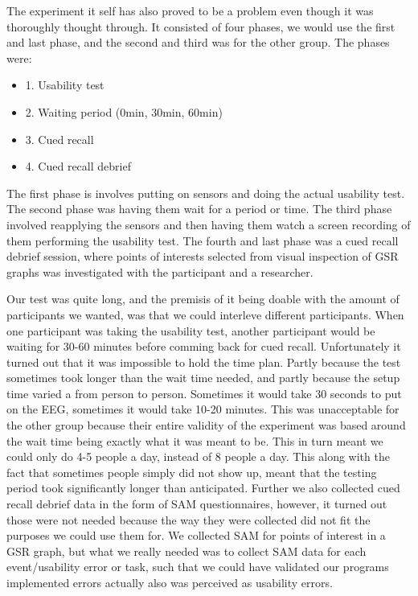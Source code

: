 The experiment it self has also proved to be a problem even though it was thoroughly thought through. 
It consisted of four phases, we would use the first and last phase, and the second and third was for the other group. The phases were:

\begin{itemize}
\item 1. Usability test
\item 2. Waiting period (0min, 30min, 60min)
\item 3. Cued recall
\item 4. Cued recall debrief
\end{itemize}

The first phase is involves putting on sensors and doing the actual usability test. The second phase was having them wait for a period or time. 
The third phase involved reapplying the sensors and then having them watch a screen recording of them performing the usability test.
The fourth and last phase was a cued recall debrief session, where points of interests selected from visual inspection of GSR graphs was investigated with the participant and a researcher.

Our test was quite long, and the premisis of it being doable with the amount of participants we wanted, was that we could interleve different participants. 
When one participant was taking the usability test, another participant would be waiting for 30-60 minutes before comming back for cued recall. 
Unfortunately it turned out that it was impossible to hold the time plan. Partly because the test sometimes took longer than the wait time needed, and partly because the setup time varied a from person to person. Sometimes it would take 30 seconds to put on the EEG, sometimes it would take 10-20 minutes. This was unacceptable for the other group because their entire validity of the experiment was based around the wait time being exactly what it was meant to be.
This in turn meant we could only do 4-5 people a day, instead of 8 people a day. 
This along with the fact that sometimes people simply did not show up, meant that the testing period took significantly longer than anticipated. 
Further we also collected cued recall debrief data in the form of SAM questionnaires, however, it turned out those were not needed because the way they were collected did not fit the purposes we could use them for. We collected SAM for points of interest in a GSR graph, but what we really needed was to collect SAM data for each event/usability error or task, such that we could have validated our programs implemented errors actually also was perceived as usability errors. 

